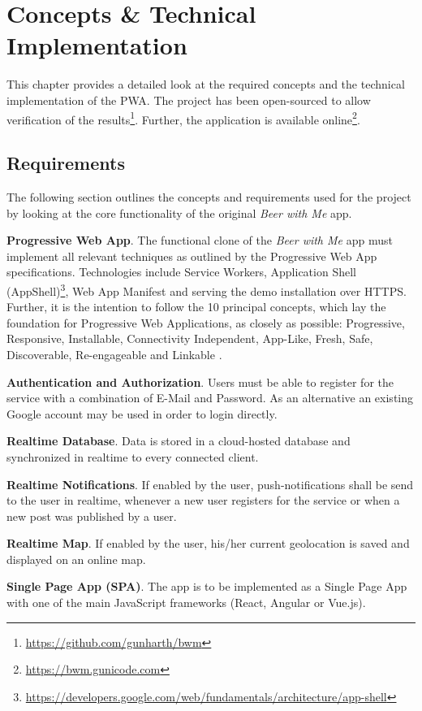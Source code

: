 \chapter{Concepts \& Technical Implementation}
This chapter provides a detailed look at the required concepts and the technical implementation of the PWA. The project has been open-sourced to allow verification of the results\footnote{\url{https://github.com/gunharth/bwm}}. Further, the application is available online\footnote{\url{https://bwm.gunicode.com}}.

\section{Requirements}

The following section outlines the concepts and requirements used for the project by looking at the core functionality of the original \textit{Beer with Me} app.

\textbf{Progressive Web App}. The functional clone of the \textit{Beer with Me} app must implement all relevant techniques as outlined by the Progressive Web App specifications. Technologies include Service Workers, Application Shell (AppShell)\footnote{\url{https://developers.google.com/web/fundamentals/architecture/app-shell}}, Web App Manifest and serving the demo installation over HTTPS. Further, it is the intention to follow the 10 principal concepts, which lay the foundation for Progressive Web Applications, as closely as possible: Progressive, Responsive, Installable, Connectivity Independent, App-Like, Fresh, Safe, Discoverable, Re-engageable and Linkable \citep{osmaniGettingStartedProgressive2015}.

\textbf{Authentication and Authorization}. Users must be able to register for the service with a combination of E-Mail and Password. As an alternative an existing Google account may be used in order to login directly.

\textbf{Realtime Database}. Data is stored in a cloud-hosted database and synchronized in realtime to every connected client.

\textbf{Realtime Notifications}. If enabled by the user, push-notifications shall be send to the user in realtime, whenever a new user registers for the service or when a new post was published by a user.

\textbf{Realtime Map}. If enabled by the user, his/her current geolocation is saved and displayed on an online map.

\textbf{Single Page App (SPA)}. The app is to be implemented as a Single Page App with one of the main JavaScript frameworks (React, Angular or Vue.js).

